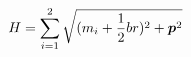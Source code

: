 \begin{equation}                                
H=\sum_{i=1}^{2}\sqrt{(m_{i}+\frac{1}{2}br)^{2}+\mbox{\boldmath $p$}^{2}}                                
\end{equation} 
